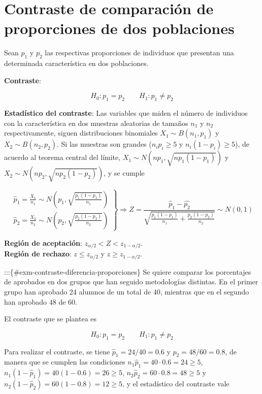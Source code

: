 \documentclass[
  a4paper,
]{scrreport}
\theoremstyle{plain}
\theoremstyle{definition}
\theoremstyle{definition}
\theoremstyle{remark}
\begin{document}
\section{Contraste de comparación de proporciones de dos
poblaciones}\label{contraste-de-comparaciuxf3n-de-proporciones-de-dos-poblaciones}

Sean \(p_1\) y \(p_2\) las respectivas proporciones de individuos que
presentan una determinada característica en dos poblaciones.

\textbf{Contraste}:

\[
H_0: p_1=p_2\qquad H_1: p_1\neq p_2
\]

\textbf{Estadístico del contraste}: Las variables que miden el número de
individuos con la característica en dos muestras aleatorias de tamaños
\(n_1\) y \(n_2\) respectivamente, siguen distribuciones binomiales
\(X_1\sim B(n_1,p_1)\) y \(X_2\sim B(n_2,p_2)\). Si las muestras son
grandes (\(n_ip_i\geq 5\) y \(n_i(1-p_i)\geq 5\)), de acuerdo al teorema
central del límite, \(X_1\sim N(np_1,\sqrt{np_1(1-p_1)})\) y
\(X_2\sim N(np_2,\sqrt{np_2(1-p_2)})\), y se cumple

\[
\left.
\begin{array}{l}
\hat{p}_1=\frac{X_1}{n_1} \sim N\left(p_1,\sqrt{\frac{p_1(1-p_1)}{n_1}}\right) \\
\hat{p}_2=\frac{X_2}{n_2} \sim N\left(p_2,\sqrt{\frac{p_2(1-p_2)}{n_2}}\right)
\end{array}
\right\}
\Rightarrow Z = \frac{\hat{p}_1-\hat{p_2}}{\sqrt{\frac{p_1(1-p_1)}{n_1}+\frac{p_2(1-p_2)}{n_2}}}\sim N(0,1)
\]

\textbf{Región de aceptación}: \(z_{\alpha/2}< Z < z_{1-\alpha/2}\).\\
\textbf{Región de rechazo}: \(z\leq z_{\alpha/2}\) y
\(z\geq z_{1-\alpha/2}\).

:::\{\#exm-contraste-diferencia-proporciones\} Se quiere comparar los
porcentajes de aprobados en dos grupos que han seguido metodologías
distintas. En el primer grupo han aprobado 24 alumnos de un total de 40,
mientras que en el segundo han aprobado 48 de 60.

El contraste que se plantea es

\[
H_0: p_1=p_2\qquad H_1: p_1\neq p_2
\]

Para realizar el contraste, se tiene \(\hat{p}_1=24/40= 0.6\) y
\(\hat{p}_2=48/60=0.8\), de manera que se cumplen las condiciones
\(n_1\hat{p}_1=40\cdot 0.6=24\geq 5\),
\(n_1(1-\hat{p}_1)=40(1-0.6)=26\geq 5\),
\(n_2\hat{p}_2=60\cdot 0.8=48\geq 5\) y
\(n_2(1-\hat{p}_2)=60(1-0.8)=12\geq 5\), y el estadístico del contraste
vale
\end{document}
